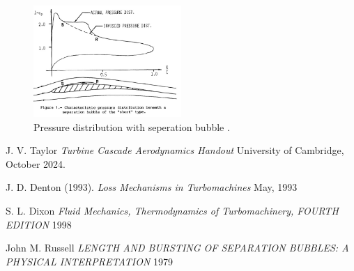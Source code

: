 \documentclass{article}
\begin{document}
\begin{figure}[H]
    \centering
    \includegraphics[width=0.5\textwidth]{figures/flat_cp_bubble.jpg}
    \caption{Pressure distribution with seperation bubble \cite{separation}.}
    \label{fig:flat_cp_bubble}
\end{figure}


\begin{thebibliography}{9}


  J. V. Taylor
  \emph{Turbine Cascade Aerodynamics Handout}
  University of Cambridge,
  October 2024.

  J. D. Denton (1993).
  \emph{Loss Mechanisms in Turbomachines}
  May, 1993 

  S. L. Dixon
  \emph{Fluid Mechanics, Thermodynamics of Turbomachinery, FOURTH EDITION}
  1998

  John M. Russell
  \emph{LENGTH AND BURSTING OF SEPARATION BUBBLES: A PHYSICAL INTERPRETATION}
  1979
\end{thebibliography}
\end{document}
